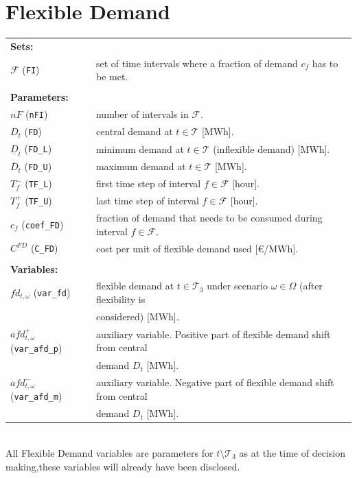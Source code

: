 \documentclass{article}
\begin{document}
\section{Flexible Demand}
\label{SEC:FlexibleDemand}

\begin{tabularx}{\textwidth}{l l}
    \textbf{Sets:} \\
    $\mathcal{F}$ (\verb|FI|) & set of time intervals where a fraction of demand $c_f$ has to be met. \\ 
    \\
    
    \textbf{Parameters:} \\
    	$nF$ (\verb|nFI|) & number of intervals in $\mathcal{F}$. \\
    $D_t$ (\verb|FD|) & central demand at $t \in \mathcal{T}$ [MWh]. \\
    $\underline{D}_t$ (\verb|FD_L|) & minimum demand at $t \in \mathcal{T}$ (inflexible demand) [MWh]. \\
    $\overline{D}_t$ (\verb|FD_U|) & maximum demand at $t \in \mathcal{T}$ [MWh]. \\
    $T_f^-$ (\verb|TF_L|) & first time step of interval $f \in \mathcal{F}$ [hour]. \\
    $T_f^+$ (\verb|TF_U|) & last time step of interval $f \in \mathcal{F}$ [hour]. \\
    $c_f$ (\verb|coef_FD|) & fraction of demand that needs to be consumed during interval $f \in \mathcal{F}$. \\
    $C^{FD}$ (\verb|C_FD|) & cost per unit of flexible demand used [\euro/MWh]. \\
    \\
       
\textbf{Variables:} \\
$fd_{t, \omega}$ (\verb|var_fd|) & flexible demand at $t \in \mathcal{T}_3$ under scenario $\omega \in \Omega$ (after flexibility is \\
& considered) [MWh]. \\
$afd_{t, \omega}^+$ (\verb|var_afd_p|) & auxiliary variable. Positive part of flexible demand shift from central \\
& demand $D_t$ [MWh]. \\
$afd_{t, \omega}^-$ (\verb|var_afd_m|) & auxiliary variable. Negative part of flexible demand shift from central \\
& demand $D_t$ [MWh]. \\

    \end{tabularx}\\
All Flexible Demand variables are parameters for $t \setminus \mathcal{T}_3$ as at the time of decision making,these variables will already have been disclosed.\\
\end{document}
